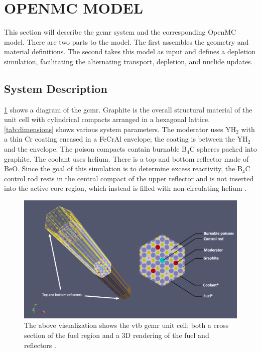 \documentclass[letterpaper]{physor2024}
\begin{document}
\section{OPENMC MODEL}\label{sec:openmc_model}
This section will describe the \gls{gcmr} system and the corresponding OpenMC model. There are two parts to the model. The first assembles the geometry and material definitions. The second takes this model as input and defines a depletion simulation, facilitating the alternating transport, depletion, and nuclide updates.

\subsection{System Description}\label{sec:system}
 \cref{fig:vtb_gcmr} shows a diagram of the \gls{gcmr}. Graphite is the overall structural material of the unit cell with cylindrical compacts arranged in a hexagonal lattice. \cref{tab:dimensions} shows various system parameters. The moderator uses YH$_{2}$ with a thin Cr coating encased in a FeCrAl envelope; the coating is between the YH$_{2}$ and the envelope. The poison compacts contain burnable B$_{4}$C spheres packed into graphite. The coolant uses helium. There is a top and bottom reflector made of BeO. Since the goal of this simulation is to determine excess reactivity, the B$_{4}$C control rod rests in the central compact of the upper reflector and is not inserted into the active core region, which instead is filled with non-circulating helium \cite{Abdelhameed-ANS-2022}.
\begin{figure}[h!]
    \centering
    \includegraphics[width=0.725\linewidth]{figures/vtb_gcmr_diagram.jpg}
    \caption{The above visualization shows the \gls{vtb} \gls{gcmr} unit cell: both a cross section of the fuel region and a 3D rendering of the fuel and reflectors \cite{Stauff-applications-2022}.}
    \label{fig:vtb_gcmr}
\end{figure}
\vspace*{-0.6cm}
\end{document}
